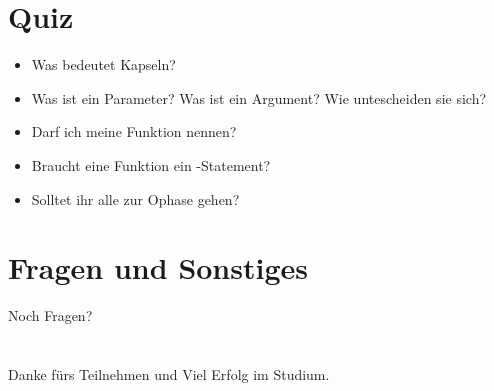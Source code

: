 \livecoding


\subsection{}

\section{Quiz}
\begin{frame}
    \slidehead
    \begin{itemize}
        \item Was bedeutet Kapseln?
            \pause
        \item Was ist ein Parameter?
        Was ist ein Argument?
        Wie untescheiden sie sich?
            \pause
        \item Darf ich meine Funktion  nennen?
            \pause
        \item Braucht eine Funktion ein -Statement?
            \pause
        \item Solltet ihr alle zur Ophase gehen?
    \end{itemize}
\end{frame}

\section{Fragen und Sonstiges}
\begin{frame}
    \slidehead
    \vspace{1.8cm}
    \centering
    \huge Noch Fragen?
\end{frame}

\section{}
\subsection{}

\begin{frame}
    \slidehead
    \vspace{1.8cm}
    \centering
    \huge Danke fürs Teilnehmen und Viel Erfolg im Studium.
\end{frame}



